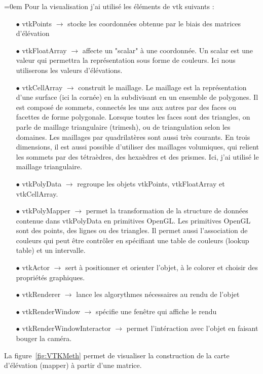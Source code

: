 \documentclass[a4paper,12pt]{article}
\begin{document}
\vspace{0.25cm}
\parindent=0em Pour la visualisation j'ai utilisé les éléments de vtk suivants :
\begin{itemize}\setlength{\itemsep}{1mm}
	\item[$\bullet$] vtkPoints	$\rightarrow$ stocke les coordonnées obtenue par le biais des matrices d'élévation 
	\item[$\bullet$] vtkFloatArray $\rightarrow$ affecte un "scalar" à une coordonnée. Un scalar est une valeur qui permettra la représentation sous forme de couleurs. Ici nous utiliserons les valeurs d'élévations.
	\item[$\bullet$] vtkCellArray $\rightarrow$ construit le maillage. Le maillage est la représentation d'une surface (ici la cornée) en la subdivisant en un ensemble de polygones. Il est composé de sommets,  connectés les uns aux autres par des faces ou facettes de forme polygonale. Lorsque toutes les faces sont des triangles, on parle de maillage triangulaire (trimesh), ou de triangulation selon les domaines. Les maillages par quadrilatères sont aussi très courants. En trois dimensions, il est aussi possible d'utiliser des maillages volumiques, qui relient les sommets par des tétraèdres, des hexaèdres et des prismes. Ici, j'ai utilisé le maillage triangulaire. 
	\item[$\bullet$] vtkPolyData $\rightarrow$ regroupe les objets vtkPoints, vtkFloatArray et vtkCellArray.
	\item[$\bullet$] vtkPolyMapper	$\rightarrow$ permet la transformation de la structure de données contenue dans vtkPolyData en primitives OpenGL. Les primitives OpenGL sont des points, des lignes ou des triangles. Il permet aussi l'association de couleurs qui peut être contrôler en spécifiant une table de couleurs (lookup table) et un intervalle.
	\item[$\bullet$] vtkActor $\rightarrow$ sert à positionner et orienter l'objet, à le colorer et choisir des propriétés graphiques. 
	\item[$\bullet$] vtkRenderer $\rightarrow$ lance les algorythmes nécessaires au rendu de l'objet
	\item[$\bullet$] vtkRenderWindow $\rightarrow$ spécifie une fenêtre qui affiche le rendu
	\item[$\bullet$] vtkRenderWindowInteractor $\rightarrow$ permet l'intéraction avec l'objet en faisant bouger la caméra.
\end{itemize}
 \vspace{0.25cm}
La figure~\ref{fig:VTKMeth} permet de visualiser la construction de la carte d'élévation (mapper) à partir d'une matrice.
\end{document}
